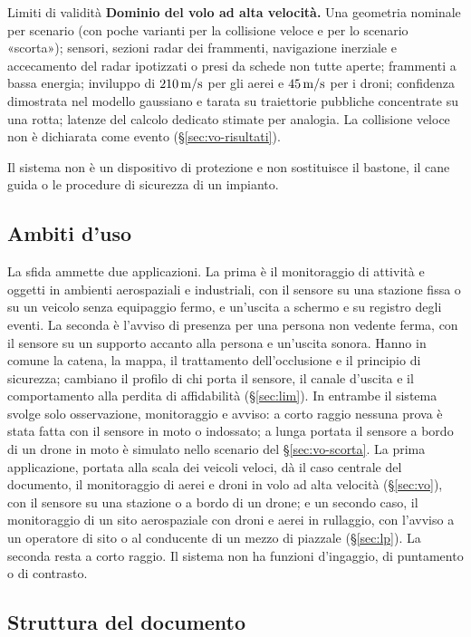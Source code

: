 \begin{riquadro}{Limiti di validità}
\textbf{Dominio del volo ad alta velocità.} Una geometria nominale per scenario (con poche varianti per la collisione veloce e per lo scenario «scorta»); sensori, sezioni radar dei frammenti, navigazione inerziale e accecamento del radar ipotizzati o presi da schede non tutte aperte; frammenti a bassa energia; inviluppo di $210\,\mathrm{m/s}$ per gli aerei e $45\,\mathrm{m/s}$ per i droni; confidenza dimostrata nel modello gaussiano e tarata su traiettorie pubbliche concentrate su una rotta; latenze del calcolo dedicato stimate per analogia. La collisione veloce non è dichiarata come evento (\S\ref{sec:vo-risultati}).

Il sistema non è un dispositivo di protezione e non sostituisce il bastone, il cane guida o le procedure di sicurezza di un impianto.
\end{riquadro}

\subsection{Ambiti d'uso}\label{sec:intro-ambiti}

La sfida ammette due applicazioni. La prima è il monitoraggio di attività e oggetti in ambienti aerospaziali e industriali, con il sensore su una stazione fissa o su un veicolo senza equipaggio fermo, e un'uscita a schermo e su registro degli eventi. La seconda è l'avviso di presenza per una persona non vedente ferma, con il sensore su un supporto accanto alla persona e un'uscita sonora. Hanno in comune la catena, la mappa, il trattamento dell'occlusione e il principio di sicurezza; cambiano il profilo di chi porta il sensore, il canale d'uscita e il comportamento alla perdita di affidabilità (\S\ref{sec:lim}). In entrambe il sistema svolge solo osservazione, monitoraggio e avviso: a corto raggio nessuna prova è stata fatta con il sensore in moto o indossato; a lunga portata il sensore a bordo di un drone in moto è simulato nello scenario del \S\ref{sec:vo-scorta}. La prima applicazione, portata alla scala dei veicoli veloci, dà il caso centrale del documento, il monitoraggio di aerei e droni in volo ad alta velocità (\S\ref{sec:vo}), con il sensore su una stazione o a bordo di un drone; e un secondo caso, il monitoraggio di un sito aerospaziale con droni e aerei in rullaggio, con l'avviso a un operatore di sito o al conducente di un mezzo di piazzale (\S\ref{sec:lp}). La seconda resta a corto raggio. Il sistema non ha funzioni d'ingaggio, di puntamento o di contrasto.

\subsection{Struttura del documento}\label{sec:intro-struttura}

